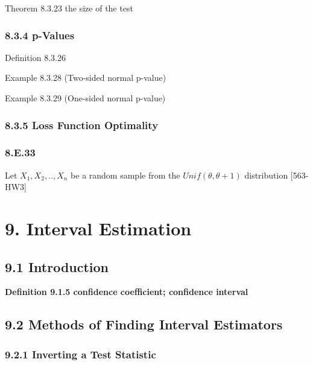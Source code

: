 \documentclass[10pt,twocolumn,portrait]{article}
\begin{document}
Theorem 8.3.23 the size of the test

\hypertarget{p-values}{%
\subsubsection{8.3.4 p-Values}\label{p-values}}

Definition 8.3.26

Example 8.3.28 (Two-sided normal p-value)

Example 8.3.29 (One-sided normal p-value)

\hypertarget{loss-function-optimality-1}{%
\subsubsection{8.3.5 Loss Function
Optimality}\label{loss-function-optimality-1}}

\hypertarget{e.33}{%
\subsubsection{8.E.33}\label{e.33}}

Let \(X_1,X_2,..,X_n\) be a random sample from the
\(Unif(\theta,\theta+1)\) distribution {[}563-HW3{]}

\hypertarget{interval-estimation}{%
\section{9. Interval Estimation}\label{interval-estimation}}

\hypertarget{CI}{%
\subsection{9.1 Introduction}\label{CI}}

\textbf{Definition 9.1.5 confidence coefficient; confidence interval}

\hypertarget{methods-of-finding-interval-estimators}{%
\subsection{9.2 Methods of Finding Interval
Estimators}\label{methods-of-finding-interval-estimators}}

\hypertarget{inverting-a-test-statistic}{%
\subsubsection{9.2.1 Inverting a Test
Statistic}\label{inverting-a-test-statistic}}
\end{document}
